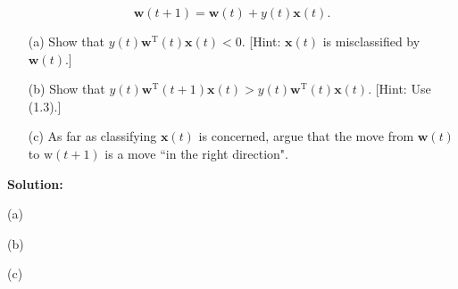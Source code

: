 \documentclass[10pt]{article}
\begin{document}
\begin{enumerate}[1.]
            \begin{equation}
                \mathbf{w}(t+1)=\mathbf{w}(t)+y(t) \mathbf{x}(t).    
            \end{equation}

                
		\begin{itemize}
			\item[(a)] Show that $y(t) \mathbf{w}^{\mathrm{T}}(t) \mathbf{x}(t)<0$. [Hint: $\mathbf{x}(t)$ is misclassified by $\mathbf{w}(t)$.]~ 
			\item[(b)] Show that $y(t) \mathbf{w}^{\mathrm{T}}(t+1) \mathbf{x}(t)>y(t) \mathbf{w}^{\mathrm{T}}(t) \mathbf{x}(t)$. [Hint: Use (1.3).]~ 
			\item[(c)]   As far as classifying $\mathbf{x}(t)$ is concerned, argue that the move from $\mathbf{w}(t)$ to $\mathrm{w}(t+1)$ is a move ``in the right direction".~ 
		\end{itemize}

		\textbf{Solution:}
        
(a)




(b)



(c)




\end{enumerate}
\end{document}
